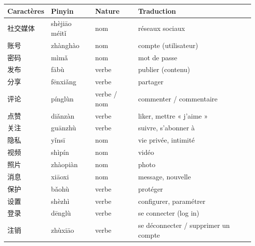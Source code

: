 \documentclass[11pt]{article}
\begin{document}
\begin{definition}
\begin{center}
\begin{tabularx}{\linewidth}{|X|X|X|X|}
\hline
\rowcolor{popblueL} \textbf{Caractères} & \textbf{Pinyin} & \textbf{Nature} & \textbf{Traduction} \\ \hline
社交媒体 & shèjiāo méitǐ & nom & réseaux sociaux \\ \hline
账号 & zhànghào & nom & compte (utilisateur) \\ \hline
密码 & mìmǎ & nom & mot de passe \\ \hline
发布 & fābù & verbe & publier (contenu) \\ \hline
分享 & fēnxiǎng & verbe & partager \\ \hline
评论 & pínglùn & verbe / nom & commenter / commentaire \\ \hline
点赞 & diǎnzàn & verbe & liker, mettre « j'aime » \\ \hline
关注 & guānzhù & verbe & suivre, s'abonner à \\ \hline
隐私 & yǐnsī & nom & vie privée, intimité \\ \hline
视频 & shìpín & nom & vidéo \\ \hline
照片 & zhàopiàn & nom & photo \\ \hline
消息 & xiāoxi & nom & message, nouvelle \\ \hline
保护 & bǎohù & verbe & protéger \\ \hline
设置 & shèzhì & verbe & configurer, paramétrer \\ \hline
登录 & dēnglù & verbe & se connecter (log in) \\ \hline
注销 & zhùxiāo & verbe & se déconnecter / supprimer un compte \\ \hline
\end{tabularx}
\end{center}
\end{definition}
\end{document}
